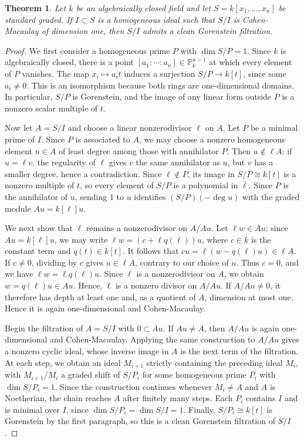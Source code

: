 \documentclass[11pt,letterpaper]{amsart}
\theoremstyle{plain}
\newtheorem{thm}{Theorem}[section]
\theoremstyle{definition}
\theoremstyle{remark}
\begin{document}
\begin{thm}\label{dimoneclean}
    Let \(k\) be an algebraically closed field and let \(S=k[x_1,\ldots,x_n]\) be standard graded. If \(I\subset S\) is a homogeneous ideal such that \(S/I\) is Cohen-Macaulay of dimension one, then \(S/I\) admits a clean Gorenstein filtration.
\end{thm}
\begin{proof}
We first consider a homogeneous prime \(P\) with \(\dim S/P=1\). Since \(k\) is algebraically closed, there is a point \([a_1:\cdots:a_n]\in\mathbb P^{n-1}_k\) at which every element of \(P\) vanishes. The map \(x_i\mapsto a_it\) induces a surjection \(S/P\to k[t]\), since some \(a_i\ne 0\). This is an isomorphism because both rings are one-dimensional domains. In particular, \(S/P\) is Gorenstein, and the image of any linear form outside \(P\) is a nonzero scalar multiple of \(t\).

Now let \(A=S/I\) and choose a linear nonzerodivisor \(\ell\) on \(A\). Let \(P\) be a minimal prime of \(I\). Since \(P\) is associated to \(A\), we may choose a nonzero homogeneous element \(u\in A\) of least degree among those with annihilator \(P\). Then \(u\notin\ell A\): if \(u=\ell v\), the regularity of \(\ell\) gives \(v\) the same annihilator as \(u\), but \(v\) has a smaller degree, hence a contradiction. Since \(\ell\notin P\), its image in \(S/P\cong k[t]\) is a nonzero multiple of \(t\), so every element of \(S/P\) is a polynomial in \(\bar\ell\). Since \(P\) is the annihilator of \(u\), sending \(1\) to \(u\) identifies \((S/P)(-\deg u)\) with the graded module \(Au=k[\ell]u\).

We next show that \(\ell\) remains a nonzerodivisor on \(A/Au\). Let \(\ell w\in Au\); since \(Au=k[\ell]u\), we may write \(\ell w=(c+\ell q(\ell))u\), where \(c\in k\) is the constant term and \(q(t)\in k[t]\). It follows that \(cu=\ell(w-q(\ell)u)\in\ell A\). If \(c\ne0\), dividing by \(c\) gives \(u\in\ell A\), contrary to our choice of \(u\). Thus \(c=0\), and we have \(\ell w=\ell q(\ell)u\). Since \(\ell\) is a nonzerodivisor on \(A\), we obtain \(w=q(\ell)u\in Au\). Hence, $\ell$ is a nonzero divisor on $A/Au$. If \(A/Au\ne0\), it therefore has depth at least one and, as a quotient of \(A\), dimension at most one. Hence it is again one-dimensional and Cohen-Macaulay.

Begin the filtration of \(A=S/I\) with \(0\subset Au\). If \(Au\ne A\), then \(A/Au\) is again one-dimensional and Cohen-Macaulay. Applying the same construction to \(A/Au\) gives a nonzero cyclic ideal, whose inverse image in \(A\) is the next term of the filtration. At each step, we obtain an ideal \(M_{i+1}\) strictly containing the preceding ideal \(M_i\), with \(M_{i+1}/M_i\) a graded shift of \(S/P_i\) for some homogeneous prime \(P_i\) with \(\dim S/P_i=1\). Since the construction continues whenever \(M_i\ne A\) and \(A\) is Noetherian, the chain reaches \(A\) after finitely many steps. Each \(P_i\) contains \(I\) and is minimal over \(I\), since \(\dim S/P_i=\dim S/I=1\). Finally, \(S/P_i\cong k[t]\) is Gorenstein by the first paragraph, so this is a clean Gorenstein filtration of \(S/I\).
\end{proof}
\end{document}
